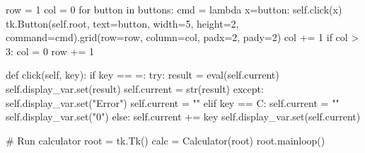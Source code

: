\documentclass[
  letterpaper,
  DIV=11,
  numbers=noendperiod,
  oneside]{scrreprt}
\newenvironment{Shaded}{}{}
\newcommand{\BuiltInTok}[1]{\textcolor[rgb]{0.84,0.23,0.29}{#1}}
\newcommand{\CommentTok}[1]{\textcolor[rgb]{0.42,0.45,0.49}{#1}}
\newcommand{\ControlFlowTok}[1]{\textcolor[rgb]{0.84,0.23,0.29}{#1}}
\newcommand{\DecValTok}[1]{\textcolor[rgb]{0.00,0.36,0.77}{#1}}
\newcommand{\KeywordTok}[1]{\textcolor[rgb]{0.84,0.23,0.29}{#1}}
\newcommand{\NormalTok}[1]{\textcolor[rgb]{0.14,0.16,0.18}{#1}}
\newcommand{\OperatorTok}[1]{\textcolor[rgb]{0.14,0.16,0.18}{#1}}
\newcommand{\StringTok}[1]{\textcolor[rgb]{0.01,0.18,0.38}{#1}}
\newcommand{\VariableTok}[1]{\textcolor[rgb]{0.89,0.38,0.04}{#1}}
\begin{document}
\begin{Shaded}
\begin{Highlighting}[]
\NormalTok{        row }\OperatorTok{=} \DecValTok{1}
\NormalTok{        col }\OperatorTok{=} \DecValTok{0}
        \ControlFlowTok{for}\NormalTok{ button }\KeywordTok{in}\NormalTok{ buttons:}
\NormalTok{            cmd }\OperatorTok{=} \KeywordTok{lambda}\NormalTok{ x}\OperatorTok{=}\NormalTok{button: }\VariableTok{self}\NormalTok{.click(x)}
\NormalTok{            tk.Button(}\VariableTok{self}\NormalTok{.root, text}\OperatorTok{=}\NormalTok{button, width}\OperatorTok{=}\DecValTok{5}\NormalTok{, height}\OperatorTok{=}\DecValTok{2}\NormalTok{,}
\NormalTok{                     command}\OperatorTok{=}\NormalTok{cmd).grid(row}\OperatorTok{=}\NormalTok{row, column}\OperatorTok{=}\NormalTok{col, padx}\OperatorTok{=}\DecValTok{2}\NormalTok{, pady}\OperatorTok{=}\DecValTok{2}\NormalTok{)}
\NormalTok{            col }\OperatorTok{+=} \DecValTok{1}
            \ControlFlowTok{if}\NormalTok{ col }\OperatorTok{\textgreater{}} \DecValTok{3}\NormalTok{:}
\NormalTok{                col }\OperatorTok{=} \DecValTok{0}
\NormalTok{                row }\OperatorTok{+=} \DecValTok{1}
                
    \KeywordTok{def}\NormalTok{ click(}\VariableTok{self}\NormalTok{, key):}
        \ControlFlowTok{if}\NormalTok{ key }\OperatorTok{==} \StringTok{\textquotesingle{}=\textquotesingle{}}\NormalTok{:}
            \ControlFlowTok{try}\NormalTok{:}
\NormalTok{                result }\OperatorTok{=} \BuiltInTok{eval}\NormalTok{(}\VariableTok{self}\NormalTok{.current)}
                \VariableTok{self}\NormalTok{.display\_var.}\BuiltInTok{set}\NormalTok{(result)}
                \VariableTok{self}\NormalTok{.current }\OperatorTok{=} \BuiltInTok{str}\NormalTok{(result)}
            \ControlFlowTok{except}\NormalTok{:}
                \VariableTok{self}\NormalTok{.display\_var.}\BuiltInTok{set}\NormalTok{(}\StringTok{"Error"}\NormalTok{)}
                \VariableTok{self}\NormalTok{.current }\OperatorTok{=} \StringTok{""}
        \ControlFlowTok{elif}\NormalTok{ key }\OperatorTok{==} \StringTok{\textquotesingle{}C\textquotesingle{}}\NormalTok{:}
            \VariableTok{self}\NormalTok{.current }\OperatorTok{=} \StringTok{""}
            \VariableTok{self}\NormalTok{.display\_var.}\BuiltInTok{set}\NormalTok{(}\StringTok{"0"}\NormalTok{)}
        \ControlFlowTok{else}\NormalTok{:}
            \VariableTok{self}\NormalTok{.current }\OperatorTok{+=}\NormalTok{ key}
            \VariableTok{self}\NormalTok{.display\_var.}\BuiltInTok{set}\NormalTok{(}\VariableTok{self}\NormalTok{.current)}

\CommentTok{\# Run calculator}
\NormalTok{root }\OperatorTok{=}\NormalTok{ tk.Tk()}
\NormalTok{calc }\OperatorTok{=}\NormalTok{ Calculator(root)}
\NormalTok{root.mainloop()}
\end{Highlighting}
\end{Shaded}
\end{document}
